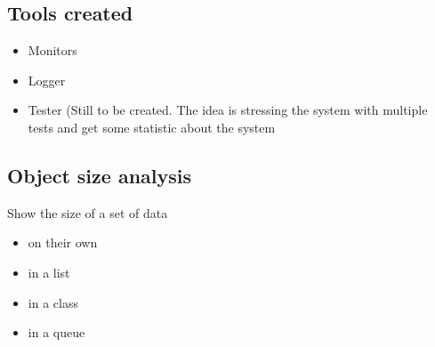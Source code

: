 \subsection{Tools created}
\begin{itemize}
    \item Monitors
    \item Logger
    \item Tester (Still to be created. The idea is stressing the system with
        multiple tests and get some statistic about the system
\end{itemize}

\subsection{Object size analysis}
Show the size of a set of data
\begin{itemize}
    \item on their own
    \item in a list
    \item in a class
    \item in a queue
\end{itemize}
